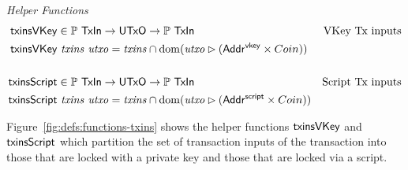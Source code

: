 \begin{figure*}[htb]
  \emph{Helper Functions}
  \begin{align*}
    \mathsf{txinsVKey} & \in \mathbb{P}~\mathsf{TxIn} \to \mathsf{UTxO} \to \mathbb{P}~\mathsf{TxIn} & \text{VKey Tx inputs}\\
    \mathsf{txinsVKey} & ~\mathit{txins}~\mathit{utxo} =
    \mathit{txins} \cap \operatorname{dom} (\mathit{utxo} \rhd (\mathsf{Addr^{vkey}} \times Coin))
    \\
    \\
    \mathsf{txinsScript} & \in \mathbb{P}~\mathsf{TxIn} \to \mathsf{UTxO} \to \mathbb{P}~\mathsf{TxIn} & \text{Script Tx inputs}\\
    \mathsf{txinsScript} & ~\mathit{txins}~\mathit{utxo} =
                        \mathit{txins} \cap \operatorname{dom} (\mathit{utxo} \rhd (\mathsf{Addr^{script}} \times Coin))
  \end{align*}
  \caption{Helper Functions for Transaction Inputs}
  \label{fig:defs:functions-txins}
\end{figure*}

Figure~\ref{fig:defs:functions-txins} shows the helper functions
$\mathsf{txinsVKey}$ and $\mathsf{txinsScript}$ which partition the set of transaction
inputs of the transaction into those that are locked with a private key and
those that are locked via a script.

\clearpage
